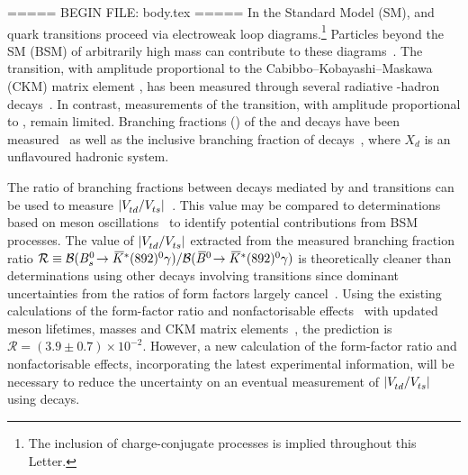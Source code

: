 ===== BEGIN FILE: body.tex =====
In the Standard Model (SM), \decay{\bquark}{\dquark\gamma} and \decay{\bquark}{\squark\gamma} quark transitions proceed via electroweak loop diagrams.\footnote{The inclusion of charge-conjugate processes is implied throughout this Letter.}
Particles beyond the SM (BSM) of arbitrarily high mass can contribute to these diagrams~\cite{Li:2013vlx,Xiao:2003vq,Ali:2002kw,Arhrib:2001gr}.
The \decay{\bquark}{\squark\gamma} transition, with amplitude proportional to the Cabibbo--Kobayashi--Maskawa (CKM) matrix element \Vtss,  has been measured through several radiative \bquark-hadron decays~\cite{LHCb-PAPER-2019-015, LHCb-PAPER-2021-030, LHCb-PAPER-2020-020, LHCb-PAPER-2024-030, LHCb-PAPER-2012-019, Belle-II:2024kbc, BaBar:2015chw, Paul:2016urs}.
In contrast, measurements of the \decay{\bquark}{\dquark\gamma} transition, with amplitude proportional to \Vtds, remain limited.
Branching fractions (\BF) of the  and  decays have been measured~\cite{LHCb-PAPER-2025-017,Belle:2024qhe,Belle:2008imr,BaBar:2008txc} as well as the inclusive branching fraction of \mbox{} decays~\cite{BaBar:2010vgu}, where $X_d$ is an unflavoured hadronic system.

The ratio of branching fractions between decays mediated by \decay{\bquark}{\dquark\gamma} and \decay{\bquark}{\squark\gamma} transitions can be used to measure $|\Vtd/\Vts|$~\cite{Ball:2006nr,Ball:2006eu}.
This value may be compared to determinations based on \BdorBs meson oscillations~\cite{LHCb-PAPER-2021-005,HFLAV23} to identify potential contributions from BSM processes.
The value of $|\Vtd/\Vts|$ extracted from the measured branching fraction ratio \mbox{$\mathcal{R}\equiv\BF(\decay{\Bs}{\Kstarzbv\gamma})/\BF(\decay{\Bzb}{\Kstarzbv\gamma})$} is theoretically cleaner than determinations using other decays involving \decay{\bquark}{\dquark\gamma} transitions since dominant uncertainties from the ratios of form factors largely cancel~\cite{Ball:2006eu}.
Using the existing calculations of the form-factor ratio and nonfactorisable effects~\cite{Ball:2006eu} with updated meson lifetimes, masses and CKM matrix elements~\cite{CKMfitter2005,CKMfitter2015,PDG2024}, the prediction is \mbox{$\mathcal{R}=(3.9\pm0.7)\times10^{-2}$}.
However, a new calculation of the form-factor ratio and nonfactorisable effects, incorporating the latest experimental information, will be necessary to reduce the uncertainty on an eventual measurement of $|\Vtd/\Vts|$ using \bskstg decays.

